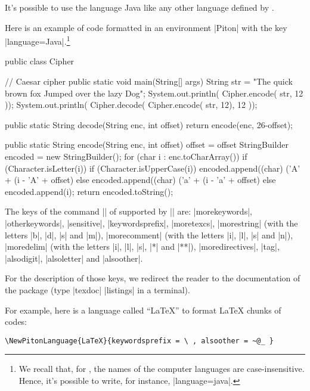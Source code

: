 \documentclass{article}
\begin{document}
\medskip
It's possible to use the language Java like any other language defined by
.

Here is an example of code formatted in an environment |{Piton}| with
the key |language=Java|.\footnote{We recall that, for , the names
of the computer languages are case-insensitive. Hence, it's possible to
write, for instance, |language=java|.}


\bigskip
\begingroup
\small
{}
\begin{Piton}[language = java]
public class Cipher {  // Caesar cipher
    public static void main(String[] args) {
        String str = "The quick brown fox Jumped over the lazy Dog";
        System.out.println( Cipher.encode( str, 12 ));
        System.out.println( Cipher.decode( Cipher.encode( str, 12), 12 ));
    }

    public static String decode(String enc, int offset) {
        return encode(enc, 26-offset);
    }

    public static String encode(String enc, int offset) {
        offset = offset %
        StringBuilder encoded = new StringBuilder();
        for (char i : enc.toCharArray()) {
            if (Character.isLetter(i)) {
                if (Character.isUpperCase(i)) {
                    encoded.append((char) ('A' + (i - 'A' + offset) %
                } else {
                    encoded.append((char) ('a' + (i - 'a' + offset) %
                }
            } else {
                encoded.append(i);
            }
        }
        return encoded.toString();
    }
}
\end{Piton}
\endgroup

\bigskip

The keys of the command |\lstdefinelanguage| of  supported by |\NewPitonLanguage| are:
|morekeywords|, |otherkeywords|, |sensitive|, |keywordsprefix|, |moretexcs|,
|morestring| (with the letters |b|,
|d|, |s| and |m|), |morecomment| (with the letters |i|, |l|, |s| and |n|),
|moredelim| (with the letters |i|,
|l|, |s|, |*| and |**|), |moredirectives|, |tag|, |alsodigit|, |alsoletter|
and |alsoother|.

For the description of those keys, we redirect the reader to the documentation
of the package  (type |texdoc| |listings| in a terminal). 

\bigskip
For example, here is a language called ``LaTeX'' to format LaTeX chunks of codes:

\begin{Verbatim}
\NewPitonLanguage{LaTeX}{keywordsprefix = \ , alsoother = ~@_ }
\end{Verbatim}
\end{document}
